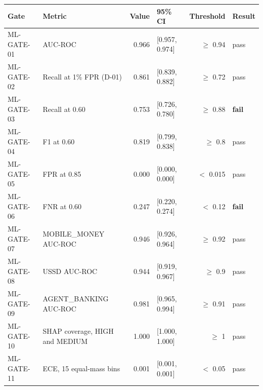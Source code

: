 \begin{tabular}{llrlrl}
\toprule
Gate & Metric & Value & 95\% CI & Threshold & Result \\
\midrule
ML-GATE-01 & AUC-ROC & 0.966 & [0.957, 0.974] & $\geq$ 0.94 & pass \\
ML-GATE-02 & Recall at 1\% FPR (D-01) & 0.861 & [0.839, 0.882] & $\geq$ 0.72 & pass \\
ML-GATE-03 & Recall at 0.60 & 0.753 & [0.726, 0.780] & $\geq$ 0.88 & \textbf{fail} \\
ML-GATE-04 & F1 at 0.60 & 0.819 & [0.799, 0.838] & $\geq$ 0.8 & pass \\
ML-GATE-05 & FPR at 0.85 & 0.000 & [0.000, 0.000] & $<$ 0.015 & pass \\
ML-GATE-06 & FNR at 0.60 & 0.247 & [0.220, 0.274] & $<$ 0.12 & \textbf{fail} \\
ML-GATE-07 & MOBILE_MONEY AUC-ROC & 0.946 & [0.926, 0.964] & $\geq$ 0.92 & pass \\
ML-GATE-08 & USSD AUC-ROC & 0.944 & [0.919, 0.967] & $\geq$ 0.9 & pass \\
ML-GATE-09 & AGENT_BANKING AUC-ROC & 0.981 & [0.965, 0.994] & $\geq$ 0.91 & pass \\
ML-GATE-10 & SHAP coverage, HIGH and MEDIUM & 1.000 & [1.000, 1.000] & $\geq$ 1 & pass \\
ML-GATE-11 & ECE, 15 equal-mass bins & 0.001 & [0.001, 0.001] & $<$ 0.05 & pass \\
\bottomrule
\end{tabular}
